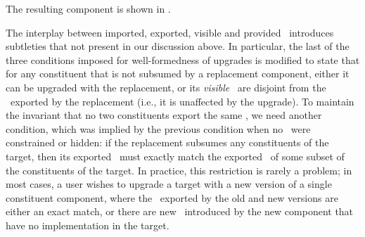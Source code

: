 The resulting component is shown in .

The interplay between imported, exported, visible and provided \apisN\
introduces subtleties that not present in our discussion above.
In particular,
the last of the three conditions imposed for well-formedness of upgrades
is modified to state
that for any constituent that is not subsumed by a replacement component,
either it can be upgraded with the replacement,
or its \emph{visible} \apisN\ are disjoint
from the \apisN\ exported by the replacement
(i.e., it is unaffected by the upgrade).
To maintain the invariant that no two constituents export
the same \apiN,
we need another condition,
which was implied by the previous condition
when no \apisN\ were constrained or hidden:
if the replacement subsumes any constituents of the target,
then its exported \apisN\ must exactly match
the exported \apisN\ of some subset of the constituents of the target.
In practice, this restriction is rarely a problem;
in most cases, a user wishes to upgrade a target
with a new version of a single constituent component,
where the \apisN\ exported by the old and new versions
are either an exact match,
or there are new \apisN\ introduced by the new component
that have no implementation in the target.
